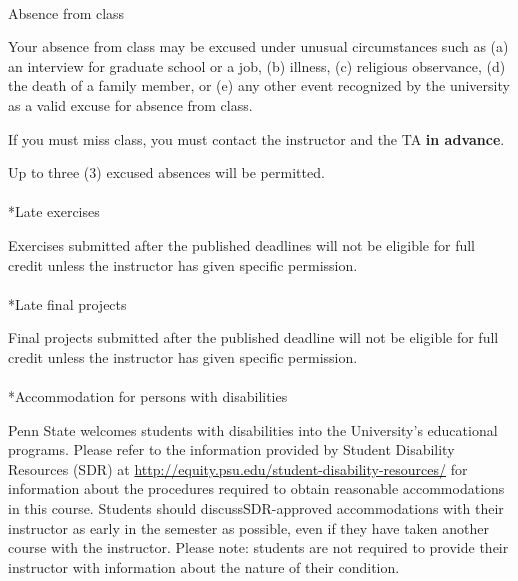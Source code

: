 \documentclass[
  letterpaper,
  DIV=11,
  numbers=noendperiod]{scrartcl}
\makeatletter
\let\oldparagraph\paragraph
\renewcommand{\paragraph}{
    \@ifstar
      \xxxParagraphStar
      \xxxParagraphNoStar
  }
\newcommand{\xxxParagraphStar}[1]{\oldparagraph*{#1}\mbox{}}
\newcommand{\xxxParagraphNoStar}[1]{\oldparagraph{#1}\mbox{}}
\makeatother
\begin{document}
\paragraph{Absence from class}\label{absence-from-class}

Your absence from class may be excused under unusual circumstances such
as (a) an interview for graduate school or a job, (b) illness, (c)
religious observance, (d) the death of a family member, or (e) any other
event recognized by the university as a valid excuse for absence from
class.

If you must miss class, you must contact the instructor and the TA
\textbf{in advance}.

Up to three (3) excused absences will be permitted.

\paragraph*{Late exercises}\label{late-exercises}

Exercises submitted after the published deadlines will not be eligible
for full credit unless the instructor has given specific permission.

\paragraph*{Late final projects}\label{late-final-projects}

Final projects submitted after the published deadline will not be
eligible for full credit unless the instructor has given specific
permission.

\paragraph*{Accommodation for persons with
disabilities}\label{disability-accommodations}

Penn State welcomes students with disabilities into the University's
educational programs. Please refer to the information provided by
Student Disability Resources (SDR) at
\url{http://equity.psu.edu/student-disability-resources/} for
information about the procedures required to obtain reasonable
accommodations in this course. Students should discussSDR-approved
accommodations with their instructor as early in the semester as
possible, even if they have taken another course with the instructor.
Please note: students are not required to provide their instructor with
information about the nature of their condition.
\end{document}
